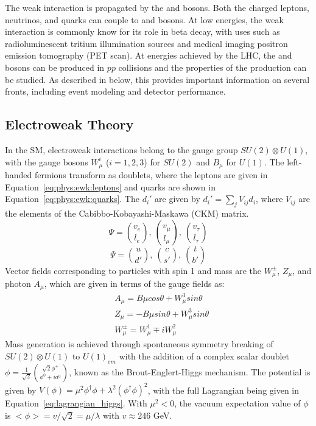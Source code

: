 The weak interaction is propagated by the \W and \Z bosons. Both the charged leptons, neutrinos, and quarks can couple to \W and \Z bosons.  At low energies, the weak interaction is commonly know for its role in beta decay, with uses such as radioluminescent tritium illumination sources and medical imaging positron emission tomography (PET scan).  At energies achieved by the LHC, the \W and \Z bosons can be produced in $pp$ collisions and the properties of the production can be studied. As described in below, this provides important information on several fronts, including event modeling and detector performance.


\subsection{Electroweak Theory}\label{ch:sm:ewk}
In the SM\cite{SMEWK1,SMEWK2,SMEWK3}, electroweak interactions belong to the gauge group $SU(2) \otimes U(1)$, with the gauge bosons $W_{\mu}^i$ ($i = 1,2,3$) for $SU(2)$ and  $B_{\mu}$ for $U(1)$.  The left-handed fermions transform as doublets, where the leptons are given in Equation~\ref{eq:phys:ewk:leptons} and quarks are shown in Equation~\ref{eq:phys:ewk:quarks}. The $d_i'$ are given by $d_i' = \sum_j V_{ij} d_i$, where $V_{ij}$ are the elements of the Cabibbo-Kobayashi-Maskawa (CKM) matrix\cite{ckm1,ckm2}.
\begin{equation}
  \Psi=\binom{v_e}{l_e},~\binom{v_{\mu}}{l_{\mu}},~\binom{v_{\tau}}{l_{\tau}}
  \label{eq:phys:ewk:leptons}
\end{equation}
\begin{equation}
  \Psi=\binom{u}{d'},~\binom{c}{s'},~\binom{t}{b'}
  \label{eq:phys:ewk:quarks}
\end{equation}
Vector fields corresponding to particles with spin 1 and mass are the $W_\mu^\pm$, $Z_\mu$, and photon $A_\mu$, which are given in terms of the gauge fields as:
\begin{equation}
\begin{aligned}
    &A_\mu = B\mu cos\theta + W^3_\mu sin\theta\\
&Z_\mu = -B\mu sin\theta + W^3_\mu sin\theta\\
&W_\mu^\pm = W_\mu^1 \mp i W^2_\mu
\end{aligned}
\label{eq:ewk_s1_particles}
\end{equation}
Mass generation is achieved through spontaneous symmetry breaking of $SU(2)\otimes U(1)$ to $U(1)_{em}$ with the addition of a complex scalar doublet $\phi = \frac{1}{\sqrt{2}}\binom{\sqrt{2}\phi^+}{\phi^0 + ia^0}$, known as the Brout-Englert-Higgs mechanism\cite{ewsb1,ewsb2,ewsb3}. The potential is given by $V(\phi) = \mu^2\phi^\dagger\phi + \lambda^2(\phi^\dagger \phi)^2$, with the full Lagrangian being given in Equation~\ref{eq:lagrangian_higgs}. With $\mu^2 < 0$, the vacuum expectation value of $\phi$ is $<\phi> = v/\sqrt{2} = \mu/\lambda$ with $v\approx 246$ GeV. 

